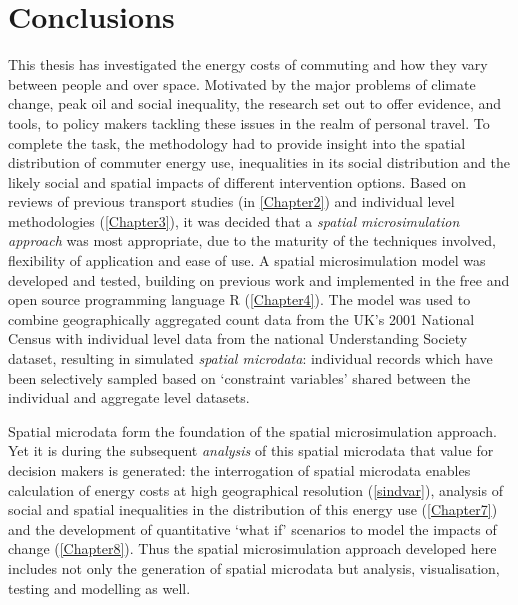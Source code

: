 
\chapter{Conclusions} %
\label{Chapter9}
\fancyhead[RE,LO]{\thepage}
This thesis has investigated the energy costs of commuting and how they vary
between people and over space.
Motivated by the major problems of climate change, peak oil and
social inequality, the research set out to offer
evidence, and tools, to policy makers tackling these issues in the realm
of personal travel.
To complete the task, the methodology had to provide insight into the
spatial distribution of commuter energy use,
inequalities in its social distribution and the likely social and spatial
impacts of different intervention options.
Based on reviews of previous transport studies (in \cref{Chapter2})
and individual level methodologies (\cref{Chapter3}), it was decided that
a \emph{spatial microsimulation approach} was most appropriate,
due to the maturity of the techniques involved, flexibility of application and
ease of use.
A spatial microsimulation model was developed and tested, building on previous
work and implemented in the free and open source programming
language R (\cref{Chapter4}). The model
was used to combine geographically aggregated count data from the UK's 2001 National Census
with individual level data from the national Understanding Society dataset,
resulting in simulated \emph{spatial microdata}: individual
records which have been selectively sampled based on `constraint variables' shared
between the individual and aggregate level datasets.

Spatial microdata form the foundation of the spatial microsimulation approach.
Yet it is during the subsequent \emph{analysis} of this spatial microdata that
value for decision makers is generated: the interrogation of spatial microdata enables
calculation of energy costs at high geographical resolution (\cref{sindvar}),
analysis of social and spatial inequalities in the distribution of this energy
use (\cref{Chapter7}) and the development of quantitative
`what if' scenarios to model the impacts of change (\cref{Chapter8}).
Thus the spatial microsimulation approach developed here
includes not only the generation of spatial microdata but
analysis, visualisation, testing and modelling as well.

